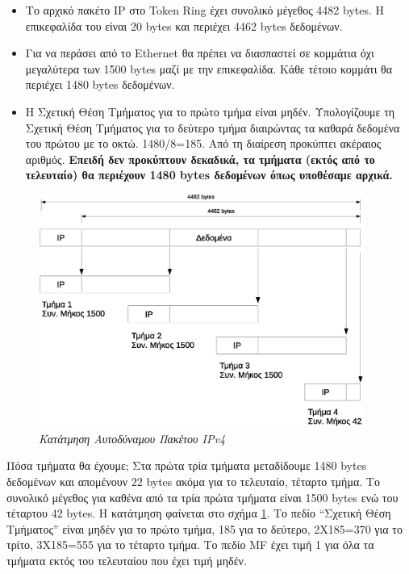 \begin{itemize}
\item Το αρχικό πακέτο IP στο Token Ring έχει συνολικό μέγεθος 4482 bytes. Η επικεφαλίδα του είναι 20 bytes και περιέχει 4462 bytes δεδομένων.
\item Για να περάσει από το Ethernet θα πρέπει να διασπαστεί σε κομμάτια όχι μεγαλύτερα των 1500 bytes μαζί με την επικεφαλίδα. Κάθε τέτοιο κομμάτι θα περιέχει 1480 bytes δεδομένων.
\item Η Σχετική Θέση Τμήματος για το πρώτο τμήμα είναι μηδέν. Υπολογίζουμε τη Σχετική Θέση Τμήματος για το δεύτερο τμήμα διαιρώντας τα καθαρά δεδομένα του πρώτου με το οκτώ. 1480/8=185. Από τη διαίρεση προκύπτει ακέραιος αριθμός. \textbf{Επειδή δεν προκύπτουν δεκαδικά, τα τμήματα (εκτός από το τελευταίο) θα περιέχουν 1480 bytes δεδομένων όπως υποθέσαμε αρχικά.}
\end{itemize}

\begin{figure}[!ht]
  \centering
  \includegraphics[width=0.95\textwidth]{images/chapter3/3-7}
  \caption {\textsl{Κατάτμηση Αυτοδύναμου Πακέτου IPv4}}
  \label{3-7}
\end{figure}

Πόσα τμήματα θα έχουμε; Στα πρώτα τρία τμήματα μεταδίδουμε 1480 bytes δεδομένων και απομένουν 22 bytes ακόμα για το τελευταίο, τέταρτο τμήμα. Το συνολικό μέγεθος για καθένα από τα τρία πρώτα τμήματα είναι 1500 bytes ενώ του τέταρτου 42 bytes. Η κατάτμηση φαίνεται στο σχήμα \ref{3-7}.
Το πεδίο ``Σχετική Θέση Τμήματος'' είναι μηδέν για το πρώτο τμήμα, 185 για το δεύτερο, 2Χ185=370 για το τρίτο, 3Χ185=555 για το τέταρτο τμήμα. Το πεδίο MF έχει τιμή 1 για όλα τα τμήματα εκτός του τελευταίου που έχει τιμή μηδέν.

